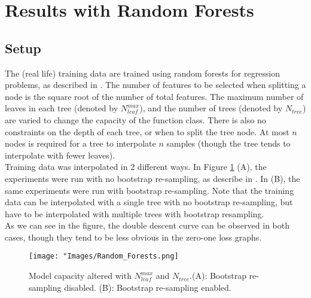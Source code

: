 \documentclass[twoside]{memoir}
\begin{document}
\section{Results with Random Forests}
\subsection{Setup}
The (real life) training data are trained using random forests for regression problems, as described in \cite{Breiman_2001}. The number of features to be selected when splitting a node is the square root of the number of total features. The maximum number of leaves in each tree (denoted by $N_{leaf}^{max}$), and the number of trees (denoted by $N_{tree}$) are varied to change the capacity of the function class. There is also no constraints on the depth of each tree, or when to split the tree node.
At most $n$ nodes is required for a tree to interpolate $n$ samples (though the tree tends to interpolate with fewer leaves).\\
Training data was interpolated in 2 different ways. In Figure \ref{fig:Random_Forests} (A), the experiments were run with no bootstrap re-sampling, as describe in \cite{Cutler_2001}. In (B), the same experiments were run with bootstrap re-sampling. Note that the training data can be interpolated with a single tree with no bootstrap re-sampling, but have to be interpolated with multiple trees with bootstrap resampling.\\
As we can see in the figure, the double descent curve can be observed in both cases, though they tend to be less obvious in the zero-one loss graphs.
\begin{figure}
	\centering
	\texttt{[image: "Images/Random\_Forests.png]}
	\par
	\caption{Model capacity altered with $N_{leaf}^{max}$ and $N_{tree}$.(A): Bootstrap re-sampling disabled. (B): Bootstrap re-sampling enabled.} \label{fig:Random_Forests}
\end{figure}
\backmatter


\end{document}

